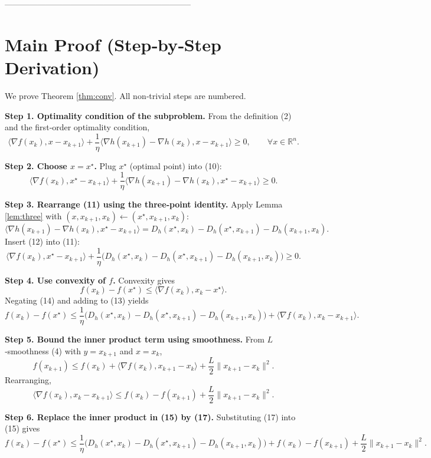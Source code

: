\documentclass{article}
\newcommand{\R}{\mathbb{R}}
\newcommand{\inner}[2]{\langle #1,#2\rangle}
\newcommand{\Breg}[2]{D_{h}(#1,#2)}
\newcommand{\grad}{\nabla}
\begin{document}
--------------------------------------------------------------------

\section*{Main Proof (Step‑by‑Step Derivation)}
We prove Theorem \ref{thm:conv}. All non‑trivial steps are numbered.

\noindent\textbf{Step 1. Optimality condition of the subproblem.}  
From the definition (2) and the first‑order optimality condition,
\[
\inner{\grad f(x_{k})}{x-x_{k+1}}+\frac{1}{\eta}\inner{\grad h(x_{k+1})-\grad h(x_{k})}{x-x_{k+1}}\ge 0,
\qquad\forall x\in\R^{n}.
\tag{10}
\]

\noindent\textbf{Step 2. Choose $x=x^{\star}$.}  
Plug $x^{\star}$ (optimal point) into (10):
\[
\inner{\grad f(x_{k})}{x^{\star}-x_{k+1}}
+\frac{1}{\eta}\inner{\grad h(x_{k+1})-\grad h(x_{k})}{x^{\star}-x_{k+1}}\ge 0.
\tag{11}
\]

\noindent\textbf{Step 3. Rearrange (11) using the three‑point identity.}  
Apply Lemma \ref{lem:three} with $(x,x_{k+1},x_{k})\gets (x^{\star},x_{k+1},x_{k})$:
\[
\inner{\grad h(x_{k+1})-\grad h(x_{k})}{x^{\star}-x_{k+1}}
= \Breg{x^{\star}}{x_{k}}-\Breg{x^{\star}}{x_{k+1}}-\Breg{x_{k+1}}{x_{k}}.
\tag{12}
\]
Insert (12) into (11):
\[
\inner{\grad f(x_{k})}{x^{\star}-x_{k+1}}
+\frac{1}{\eta}\Big(\Breg{x^{\star}}{x_{k}}-\Breg{x^{\star}}{x_{k+1}}-\Breg{x_{k+1}}{x_{k}}\Big)\ge 0.
\tag{13}
\]

\noindent\textbf{Step 4. Use convexity of $f$.}  
Convexity gives
\[
f(x_{k})-f(x^{\star})\le \inner{\grad f(x_{k})}{x_{k}-x^{\star}}.
\tag{14}
\]
Negating (14) and adding to (13) yields
\[
f(x_{k})-f(x^{\star})
\le \frac{1}{\eta}\Big(\Breg{x^{\star}}{x_{k}}-\Breg{x^{\star}}{x_{k+1}}-\Breg{x_{k+1}}{x_{k}}\Big)
+\inner{\grad f(x_{k})}{x_{k}-x_{k+1}} .
\tag{15}
\]

\noindent\textbf{Step 5. Bound the inner product term using smoothness.}  
From $L$‑smoothness (4) with $y=x_{k+1}$ and $x=x_{k}$,
\[
f(x_{k+1})\le f(x_{k})+\inner{\grad f(x_{k})}{x_{k+1}-x_{k}}+\frac{L}{2}\|x_{k+1}-x_{k}\|^{2}.
\tag{16}
\]
Rearranging,
\[
\inner{\grad f(x_{k})}{x_{k}-x_{k+1}}
\le f(x_{k})-f(x_{k+1})+\frac{L}{2}\|x_{k+1}-x_{k}\|^{2}.
\tag{17}
\]

\noindent\textbf{Step 6. Replace the inner product in (15) by (17).}  
Substituting (17) into (15) gives
\[
f(x_{k})-f(x^{\star})
\le \frac{1}{\eta}\Big(\Breg{x^{\star}}{x_{k}}-\Breg{x^{\star}}{x_{k+1}}-\Breg{x_{k+1}}{x_{k}}\Big)
+f(x_{k})-f(x_{k+1})+\frac{L}{2}\|x_{k+1}-x_{k}\|^{2}.
\tag{18}
\]
\end{document}
